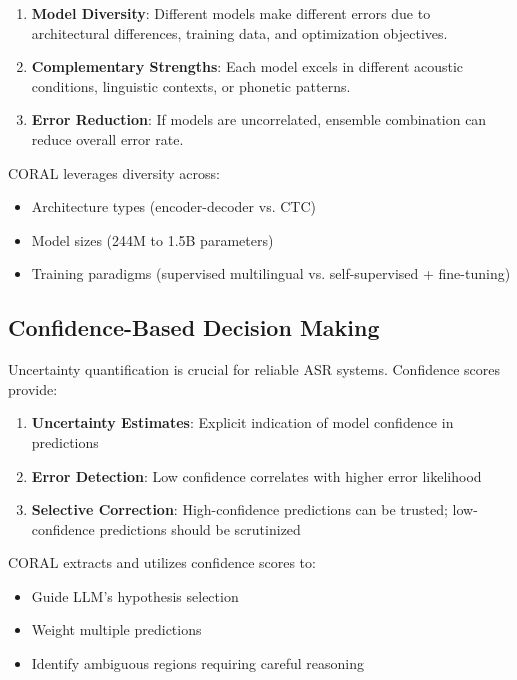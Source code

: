 \begin{enumerate}[topsep=6pt,itemsep=3pt]
    \item \textbf{Model Diversity}: Different models make different errors due to architectural differences, training data, and optimization objectives.
    
    \item \textbf{Complementary Strengths}: Each model excels in different acoustic conditions, linguistic contexts, or phonetic patterns.
    
    \item \textbf{Error Reduction}: If models are uncorrelated, ensemble combination can reduce overall error rate.
\end{enumerate}

CORAL leverages diversity across:
\begin{itemize}[topsep=4pt,itemsep=2pt]
    \item Architecture types (encoder-decoder vs. CTC)
    \item Model sizes (244M to 1.5B parameters)
    \item Training paradigms (supervised multilingual vs. self-supervised + fine-tuning)
\end{itemize}

\subsection{Confidence-Based Decision Making}

Uncertainty quantification is crucial for reliable ASR systems. Confidence scores provide:

\begin{enumerate}[topsep=6pt,itemsep=3pt]
    \item \textbf{Uncertainty Estimates}: Explicit indication of model confidence in predictions
    \item \textbf{Error Detection}: Low confidence correlates with higher error likelihood
    \item \textbf{Selective Correction}: High-confidence predictions can be trusted; low-confidence predictions should be scrutinized
\end{enumerate}

CORAL extracts and utilizes confidence scores to:
\begin{itemize}[topsep=4pt,itemsep=2pt]
    \item Guide LLM's hypothesis selection
    \item Weight multiple predictions
    \item Identify ambiguous regions requiring careful reasoning
\end{itemize}

